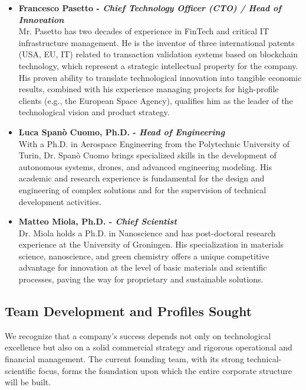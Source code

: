\begin{itemize}
    \item \textbf{Francesco Pasetto - \textit{Chief Technology Officer (CTO) / Head of Innovation}} \\
    Mr. Pasetto has two decades of experience in FinTech and critical IT infrastructure management. He is the inventor of three international patents (USA, EU, IT) related to transaction validation systems based on blockchain technology, which represent a strategic intellectual property for the company. His proven ability to translate technological innovation into tangible economic results, combined with his experience managing projects for high-profile clients (e.g., the European Space Agency), qualifies him as the leader of the technological vision and product strategy.

    \item \textbf{Luca Spanò Cuomo, Ph.D. - \textit{Head of Engineering}} \\
    With a Ph.D. in Aerospace Engineering from the Polytechnic University of Turin, Dr. Spanò Cuomo brings specialized skills in the development of autonomous systems, drones, and advanced engineering modeling. His academic and research experience is fundamental for the design and engineering of complex solutions and for the supervision of technical development activities.

    \item \textbf{Matteo Miola, Ph.D. - \textit{Chief Scientist}} \\
    Dr. Miola holds a Ph.D. in Nanoscience and has post-doctoral research experience at the University of Groningen. His specialization in materials science, nanoscience, and green chemistry offers a unique competitive advantage for innovation at the level of basic materials and scientific processes, paving the way for proprietary and sustainable solutions.
\end{itemize}

\subsection{Team Development and Profiles Sought}

We recognize that a company's success depends not only on technological excellence but also on a solid commercial strategy and rigorous operational and financial management. The current founding team, with its strong technical-scientific focus, forms the foundation upon which the entire corporate structure will be built.

